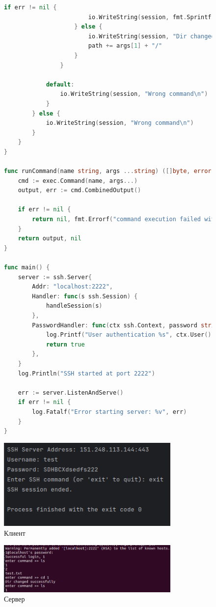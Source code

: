 \documentclass[a4paper, 14pt]{extarticle}
\begin{document}
\begin{figure}[!htb]
\begin{lstlisting}[language={Go},caption={server.go - продолжение},label={lst:code6}]
if err != nil {
						io.WriteString(session, fmt.Sprintf("Error - no such dir: %s\n", err))
					} else {
						io.WriteString(session, "Dir changed successfully\n")
						path += args[1] + "/"
					}
				}

			default:
				io.WriteString(session, "Wrong command\n")
			}
		} else {
			io.WriteString(session, "Wrong command\n")
		}
	}
}

func runCommand(name string, args ...string) ([]byte, error) {
	cmd := exec.Command(name, args...)
	output, err := cmd.CombinedOutput()

	if err != nil {
		return nil, fmt.Errorf("command execution failed with: %s", err)
	}
	return output, nil
}

func main() {
	server := ssh.Server{
		Addr: "localhost:2222",
		Handler: func(s ssh.Session) {
			handleSession(s)
		},
		PasswordHandler: func(ctx ssh.Context, password string) bool {
			log.Printf("User authentication %s", ctx.User())
			return true
		},
	}
	log.Println("SSH started at port 2222")

	err := server.ListenAndServe()
	if err != nil {
		log.Fatalf("Error starting server: %v", err)
	}
}

\end{lstlisting}
\end{figure}

\newpage

\begin{figure}[!htb]
	\centering
	\includegraphics[width=0.8\textwidth]{res1.png}
\caption{Клиент}
\label{fig:img1}
\end{figure}
\begin{figure}[!htb]
	\centering
	\includegraphics[width=0.8\textwidth]{res2.png}
\caption{Сервер}
\label{fig:img2}
\end{figure}
\end{document}
